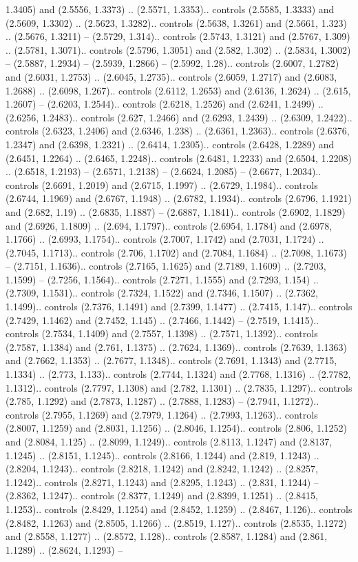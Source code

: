 1.3405) and (2.5556, 1.3373) .. (2.5571, 1.3353).. controls (2.5585, 1.3333) and (2.5609, 1.3302) .. (2.5623, 1.3282).. controls (2.5638, 1.3261) and (2.5661, 1.323) .. (2.5676, 1.3211) -- (2.5729, 1.314).. controls (2.5743, 1.3121) and (2.5767, 1.309) .. (2.5781, 1.3071).. controls (2.5796, 1.3051) and (2.582, 1.302) .. (2.5834, 1.3002) -- (2.5887, 1.2934) -- (2.5939, 1.2866) -- (2.5992, 1.28).. controls (2.6007, 1.2782) and (2.6031, 1.2753) .. (2.6045, 1.2735).. controls (2.6059, 1.2717) and (2.6083, 1.2688) .. (2.6098, 1.267).. controls (2.6112, 1.2653) and (2.6136, 1.2624) .. (2.615, 1.2607) -- (2.6203, 1.2544).. controls (2.6218, 1.2526) and (2.6241, 1.2499) .. (2.6256, 1.2483).. controls (2.627, 1.2466) and (2.6293, 1.2439) .. (2.6309, 1.2422).. controls (2.6323, 1.2406) and (2.6346, 1.238) .. (2.6361, 1.2363).. controls (2.6376, 1.2347) and (2.6398, 1.2321) .. (2.6414, 1.2305).. controls (2.6428, 1.2289) and (2.6451, 1.2264) .. (2.6465, 1.2248).. controls (2.6481, 1.2233) and (2.6504, 1.2208) .. (2.6518, 1.2193) -- (2.6571, 1.2138) -- (2.6624, 1.2085) -- (2.6677, 1.2034).. controls (2.6691, 1.2019) and (2.6715, 1.1997) .. (2.6729, 1.1984).. controls (2.6744, 1.1969) and (2.6767, 1.1948) .. (2.6782, 1.1934).. controls (2.6796, 1.1921) and (2.682, 1.19) .. (2.6835, 1.1887) -- (2.6887, 1.1841).. controls (2.6902, 1.1829) and (2.6926, 1.1809) .. (2.694, 1.1797).. controls (2.6954, 1.1784) and (2.6978, 1.1766) .. (2.6993, 1.1754).. controls (2.7007, 1.1742) and (2.7031, 1.1724) .. (2.7045, 1.1713).. controls (2.706, 1.1702) and (2.7084, 1.1684) .. (2.7098, 1.1673) -- (2.7151, 1.1636).. controls (2.7165, 1.1625) and (2.7189, 1.1609) .. (2.7203, 1.1599) -- (2.7256, 1.1564).. controls (2.7271, 1.1555) and (2.7293, 1.154) .. (2.7309, 1.1531).. controls (2.7324, 1.1522) and (2.7346, 1.1507) .. (2.7362, 1.1499).. controls (2.7376, 1.1491) and (2.7399, 1.1477) .. (2.7415, 1.147).. controls (2.7429, 1.1462) and (2.7452, 1.145) .. (2.7466, 1.1442) -- (2.7519, 1.1415).. controls (2.7534, 1.1409) and (2.7557, 1.1398) .. (2.7571, 1.1392).. controls (2.7587, 1.1384) and (2.761, 1.1375) .. (2.7624, 1.1369).. controls (2.7639, 1.1363) and (2.7662, 1.1353) .. (2.7677, 1.1348).. controls (2.7691, 1.1343) and (2.7715, 1.1334) .. (2.773, 1.133).. controls (2.7744, 1.1324) and (2.7768, 1.1316) .. (2.7782, 1.1312).. controls (2.7797, 1.1308) and (2.782, 1.1301) .. (2.7835, 1.1297).. controls (2.785, 1.1292) and (2.7873, 1.1287) .. (2.7888, 1.1283) -- (2.7941, 1.1272).. controls (2.7955, 1.1269) and (2.7979, 1.1264) .. (2.7993, 1.1263).. controls (2.8007, 1.1259) and (2.8031, 1.1256) .. (2.8046, 1.1254).. controls (2.806, 1.1252) and (2.8084, 1.125) .. (2.8099, 1.1249).. controls (2.8113, 1.1247) and (2.8137, 1.1245) .. (2.8151, 1.1245).. controls (2.8166, 1.1244) and (2.819, 1.1243) .. (2.8204, 1.1243).. controls (2.8218, 1.1242) and (2.8242, 1.1242) .. (2.8257, 1.1242).. controls (2.8271, 1.1243) and (2.8295, 1.1243) .. (2.831, 1.1244) -- (2.8362, 1.1247).. controls (2.8377, 1.1249) and (2.8399, 1.1251) .. (2.8415, 1.1253).. controls (2.8429, 1.1254) and (2.8452, 1.1259) .. (2.8467, 1.126).. controls (2.8482, 1.1263) and (2.8505, 1.1266) .. (2.8519, 1.127).. controls (2.8535, 1.1272) and (2.8558, 1.1277) .. (2.8572, 1.128).. controls (2.8587, 1.1284) and (2.861, 1.1289) .. (2.8624, 1.1293) -- 